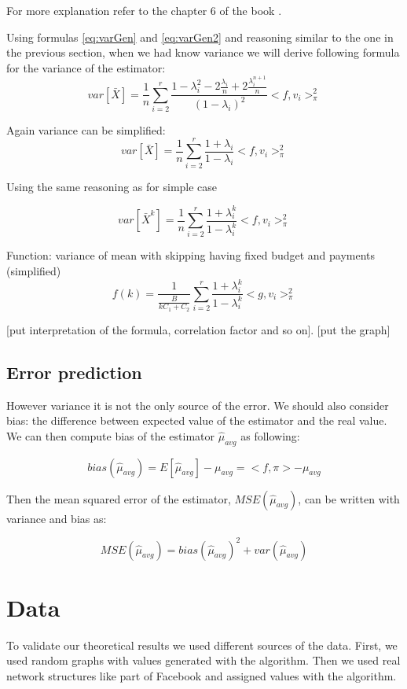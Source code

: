 \documentclass[12pt]{report}
\begin{document}
For more explanation refer to the chapter 6 of the book \cite{bremaud2013markov}.

Using formulas \ref{eq:varGen} and \ref{eq:varGen2} and reasoning similar to the one in the previous section, when we had know variance we will derive following formula for the variance of the estimator:
$$ var\left[\bar{X} \right] = \frac{1}{n} \sum_{i=2}^r\frac{1-\lambda_i^2 - 2\frac{\lambda_i}{n} + 2\frac{\lambda_i^{n+1}}{n}}{(1 - \lambda_i)^2} <f, v_i>^2_{\pi}$$

Again variance can be simplified:
$$ var\left[\bar{X} \right] = \frac{1}{n} \sum_{i=2}^r\frac{1 + \lambda_i}{1 - \lambda_i} <f, v_i>^2_{\pi}$$

Using the same reasoning as for simple case 

$$ var\left[\bar{X}^k \right] = \frac{1}{n} \sum_{i=2}^r\frac{1 + \lambda_i^k}{1 - \lambda_i^k} <f, v_i>^2_{\pi}$$

Function: variance of mean with skipping having fixed budget and payments (simplified)
$$ f(k) = \frac{1}{\frac{B}{kC_1 + C_2}} \sum_{i=2}^r\frac{1 + \lambda_i^k}{1 - \lambda_i^k} <g, v_i>^2_{\pi}$$

[put interpretation of the formula, correlation factor and so on].
[put the graph]
\subsection{Error prediction}

However variance it is not the only source of the error. We should also consider bias: the difference between expected value of the estimator and the real value. We can then compute bias of the estimator $\hat{\mu}_{avg}$ as following:

$$bias(\hat{\mu}_{avg}) = E[\hat{\mu}_{avg}] - \mu_{avg} = <f, \pi> - \mu_{avg}$$

Then the mean squared error of the estimator, $MSE(\hat{\mu}_{avg})$, can be written with variance and bias as: 

$$MSE(\hat{\mu}_{avg}) = bias(\hat{\mu}_{avg})^2 + var(\hat{\mu}_{avg})$$

\section{Data}

To validate our theoretical results we used different sources of the data. First, we used random graphs with values generated with the algorithm. 
Then we used real network structures like part of Facebook \cite{Facebook}  and assigned values with the algorithm.
\end{document}
